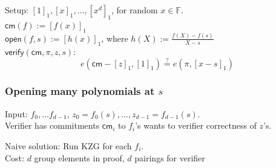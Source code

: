 \documentclass[shadesubsections,compress,14pt,mathserif]{beamer}
\newcommand{\F}{\ensuremath{\mathbb F}}
\newcommand{\enc}[1]{\ensuremath{\left[#1\right ]_1}}
\newcommand{\cm}{\ensuremath{\mathsf{cm}}}
\newcommand{\open}[1]{\ensuremath{\mathsf{open}(#1)}}
\newcommand{\verify}[1]{\ensuremath{\mathsf{verify}(#1)}}
\newcommand{\defeq}{\ensuremath{:=}}
\begin{document}
\begin{frame}

 Setup: $\enc{1},\enc{x},\ldots,\enc{x^d}$, for random $x\in \F$.\\ \pause
 \vspace{0.4in}
 $\cm(f)\defeq   \enc{f(x)}$\\ \pause
 \vspace{0.4in}
$\open{f,s}\defeq \enc{h(x)}$, where
 $h(X)\defeq \frac{f(X)-f(s)}{X-s}$\\ \pause
 \vspace{0.4in}
 $\verify{\cm,\pi,z,s}:$
\[e(\cm-\enc{z},\enc{1}) \stackrel{?}{=} e(\pi, \enc{x-s})\]
\end{frame}


\begin{frame}
\frametitle{Opening many polynomials at $s$}

 Input: $f_0,\ldots f_{d-1}$, $z_0=f_0(s),\ldots, z_{d-1}=f_{d-1}(s)$.\\ 
 Verifier has commitments $\cm_i$ to $f_i$'s wants to verifier correctness of $z$'s.\\ \pause

 \vspace{0.4in}
 
 Naive solution: Run KZG for each $f_i$.\\
 Cost: $d$ group elements in proof, $d$ pairings for verifier
 
\end{frame}
 
\end{document}
